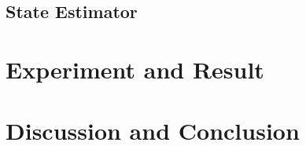 \documentclass[conference]{IEEEtran}
\begin{document}
\subsection{State Estimator}
\label{sec:statestimation}


\section{Experiment and Result}
\label{sec:experiment}



\section{Discussion and Conclusion}
\label{sec:conclusion}




\end{document}
